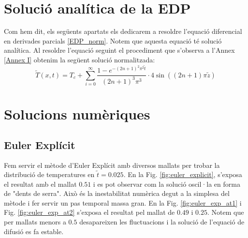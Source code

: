 \documentclass{article}
\begin{document}
\section{Solució analítica de la EDP}
Com hem dit, els següents apartats els dedicarem a resoldre l'equació diferencial en derivades parcials \eqref{EDP_norm}. Notem que aquesta equació té solució analítica. Al resoldre l'equació seguint el procediment que s'observa a l'Annex \ref{Annex I} obtenim la següent solució normalitzada:
\begin{equation*}
    \tilde{T}(x,t) = T_c + \sum_{i=0}^{\infty} \frac{ 1-e^{-(2n+1)^2 \pi^2 \tilde{t}}}{(2n+1)^3\pi^3}\cdot 4\sin((2n+1)\pi \tilde{z})
\end{equation*}

\section{Solucions numèriques}
\subsection{Euler Explícit}
Fem servir el mètode d'Euler Explícit amb diversos mallats per trobar la distribució de temperatures en $\tilde{t}=0.025$. En la Fig. \ref{fig:euler_explicit}, s'exposa el resultat amb el mallat $0.51$ i es pot observar com la solució oscil·la en forma de "dents de serra". Això és la inestabilitat numèrica degut a la simplesa del mètode i fer servir un pas temporal massa gran.  En la Fig. \ref{fig:euler_exp_at1} i Fig. \ref{fig:euler_exp_at2} s'exposa el resultat pel mallat de $0.49$ i $0.25$. Notem que per mallats menors a $0.5$ desapareixen les fluctuacions i la solució de l'equació de difusió es fa estable.
\end{document}
